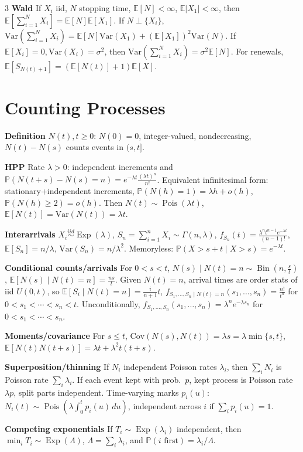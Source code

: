 \documentclass[a4paper,8pt,fleqn]{extarticle}
\newcommand{\E}{\mathbb{E}}
\newcommand{\PP}{\mathbb{P}}
\newcommand{\Var}{\mathrm{Var}}
\newcommand{\Cov}{\mathrm{Cov}}
\newcommand{\1}{\mathbf{1}}
\newcommand{\sub}[1]{\textbf{#1} }
\DeclareMathOperator{\Pois}{Pois}
\DeclareMathOperator{\Exp}{Exp}
\DeclareMathOperator{\Bin}{Bin}
\begin{document}
\begin{multicols}{3}
\sub{Wald} If \(X_i\) iid, \(N\) stopping time, \(\E[N]<\infty\), \(\E|X_1|<\infty\), then \(\E[\sum_{i=1}^N X_i]=\E[N]\E[X_1]\). If \(N\perp \{X_i\}\), \(\Var(\sum_{i=1}^N X_i)=\E[N]\Var(X_1)+(\E[X_1])^2\Var(N)\). If \(\E[X_i]=0,\Var(X_i)=\sigma^2\), then \(\Var(\sum_{i=1}^N X_i)=\sigma^2\E[N]\). For renewals, \(\E[S_{N(t)+1}]=(\E[N(t)]+1)\E[X]\).

\section*{Counting Processes}
\sub{Definition} \(N(t),t\ge0\): \(N(0)=0\), integer-valued, nondecreasing, \(N(t)-N(s)\) counts events in \((s,t]\).

\sub{HPP} Rate \(\lambda>0\): independent increments and \(\PP(N(t+s)-N(s)=n)=e^{-\lambda t}\frac{(\lambda t)^n}{n!}\). Equivalent infinitesimal form: stationary+independent increments, \(\PP(N(h)=1)=\lambda h+o(h)\), \(\PP(N(h)\ge2)=o(h)\). Then \(N(t)\sim \Pois(\lambda t)\), \(\E[N(t)]=\Var(N(t))=\lambda t\).

\sub{Interarrivals} \(X_i\stackrel{iid}{\sim}\Exp(\lambda)\), \(S_n=\sum_{i=1}^n X_i\sim \Gamma(n,\lambda)\), \(f_{S_n}(t)=\frac{\lambda^n t^{n-1}e^{-\lambda t}}{(n-1)!}\), \(\E[S_n]=n/\lambda\), \(\Var(S_n)=n/\lambda^2\). Memoryless: \(\PP(X>s+t\mid X>s)=e^{-\lambda t}\).

\sub{Conditional counts/arrivals} For \(0<s<t\), \(N(s)\mid N(t)=n\sim \Bin(n,\frac{s}{t})\), \(\E[N(s)\mid N(t)=n]=\frac{ns}{t}\). Given \(N(t)=n\), arrival times are order stats of iid \(U(0,t)\), so \(\E[S_i\mid N(t)=n]=\frac{i}{n+1}t\), \(f_{S_1,\dots,S_n\mid N(t)=n}(s_1,\dots,s_n)=\frac{n!}{t^n}\) for \(0<s_1<\cdots<s_n<t\). Unconditionally, \(f_{S_1,\dots,S_n}(s_1,\dots,s_n)=\lambda^n e^{-\lambda s_n}\) for \(0<s_1<\cdots<s_n\).

\sub{Moments/covariance} For \(s\le t\), \(\Cov(N(s),N(t))=\lambda s=\lambda\min\{s,t\}\), \(\E[N(t)N(t+s)]=\lambda t+\lambda^2 t(t+s)\).

\sub{Superposition/thinning} If \(N_i\) independent Poisson rates \(\lambda_i\), then \(\sum_i N_i\) is Poisson rate \(\sum_i\lambda_i\). If each event kept with prob.\ \(p\), kept process is Poisson rate \(\lambda p\), split parts independent. Time-varying marks \(p_i(u)\): \(N_i(t)\sim \Pois(\lambda\int_0^t p_i(u)\,du)\), independent across \(i\) if \(\sum_i p_i(u)=1\).

\sub{Competing exponentials} If \(T_i\sim\Exp(\lambda_i)\) independent, then \(\min_i T_i\sim \Exp(\Lambda)\), \(\Lambda=\sum_i \lambda_i\), and \(\PP(i\text{ first})=\lambda_i/\Lambda\).


\end{multicols}
\end{document}
